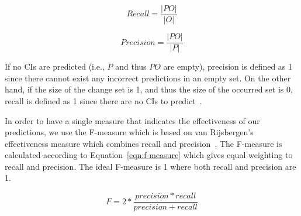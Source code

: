 \documentclass[10pt,twocolumn,letterpaper]{article}
\begin{document}
\begin{equation}
\label{eqn:recall}
Recall = \frac{|PO|}{|O|}
\end{equation}

\begin{equation}
\label{eqn:precision}
Precision = \frac{|PO|}{|P|}
\end{equation}

If no CIs are predicted (i.e., $P$ and thus $PO$ are empty), precision is defined as 1 since there cannot exist any incorrect predictions in an empty set. On
the other hand, if the size of the change set is 1, and thus the size of the occurred set is 0, recall is defined as 1 since there are no CIs to
predict~\cite{hassan2004predicting}.  

In order to have a single measure that indicates the effectiveness of our predictions, we use the F-measure which is based on van Rijsbergen's effectiveness
measure which combines recall and precision~\cite{van79}. The F-measure is calculated according to Equation~\ref{eqn:f-measure} which gives equal weighting to
recall and precision. The ideal F-measure is 1 where both recall and precision are 1.

\begin{equation}
F = 2 * \frac{precision * recall}{precision +recall}
\label{eqn:f-measure}
\end{equation}
\end{document}
